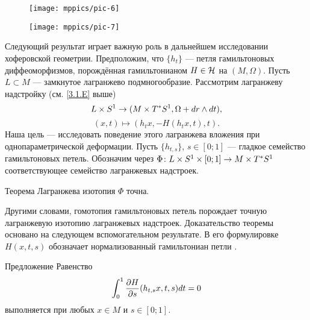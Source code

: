 \begin{figure}[ht!]
\begin{minipage}{.48\textwidth}
\centering
\texttt{[image: mppics/pic-6]}
\end{minipage}\hfill
\begin{minipage}{.48\textwidth}
\centering
\texttt{[image: mppics/pic-7]}
\end{minipage}

\medskip

\begin{minipage}{.48\textwidth}
\centering
\caption{}\label{pic-6}
\end{minipage}\hfill
\begin{minipage}{.48\textwidth}
\centering
\caption{}\label{pic-7}
\end{minipage}
\vskip-4mm
\end{figure}

Следующий результат играет важную роль в дальнейшем исследовании хоферовской геометрии.
Предположим, что $\{h_t\}$ --- петля гамильтоновых диффеоморфизмов, порождённая гамильтонианом $H \in \mathcal{H}$ на $(M, \Omega)$.
Пусть $L \subset M$ --- замкнутое лагранжево подмногообразие.
Рассмотрим лагранжеву надстройку (см. \ref{3.1.E} выше)
\[L \times S^1 \to (M \times T^\ast S^1, \Omega + d r \wedge d t),\]
\[(x, t) \mapsto (h_t x, -H (h_t x, t), t).\]
Наша цель --- исследовать поведение этого лагранжева вложения при однопараметрической деформации.
Пусть $\{h_{t, s}\}$, $s \in [0; 1]$ --- гладкое семейство гамильтоновых петель.
Обозначим через $\Phi\: L \z\times S^1 \z\times [0; 1] \z\to M \z\times T^\ast S^1$ соответствующее семейство лагранжевых надстроек.

\begin{thm}{Теорема}\label{6.1.B}
Лагранжева изотопия $\Phi$ точна.
\end{thm}

Другими словами, гомотопия гамильтоновых петель порождает точную
лагранжевую изотопию лагранжевых надстроек. 
Доказательство теоремы основано на следующем вспомогательном результате.
В его формулировке $H (x, t, s)$ обозначает нормализованный
гамильтониан петли . 

\begin{thm}{Предложение}\label{6.1.C}
Равенство 
\[\int_0^1 \frac{\partial H}{\partial s} (h_{t, s} x, t, s) d t = 0\]
выполняется при любых $x \in M$ и $s \in [0; 1]$.
\end{thm}

